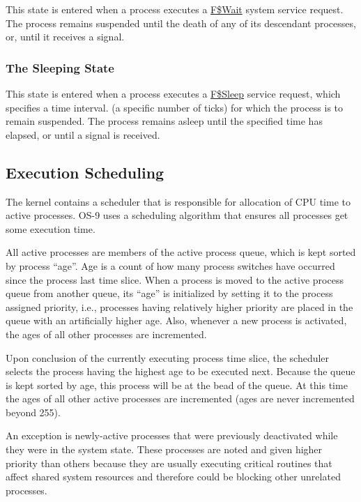\documentclass[
]{article}
\begin{document}
This state is entered when a process executes a
\hyperref[f.wait]{F\$Wait} system service request. The process remains
suspended until the death of any of its descendant processes, or, until
it receives a signal.

\subsubsection{The Sleeping State}

This state is entered when a process executes a
\hyperref[f.sleep]{F\$Sleep} service request, which specifies a time
interval. (a specific number of ticks) for which the process is to
remain suspended. The process remains asleep until the specified time
has elapsed, or until a signal is received.

\subsection{Execution Scheduling}

The kernel contains a scheduler that is responsible for allocation of
CPU time to active processes. OS-9 uses a scheduling algorithm that
ensures all processes get some execution time.

All active processes are members of the active process queue, which is
kept sorted by process ``age''. Age is a count of how many process
switches have occurred since the process\textquotesingle{} last time
slice. When a process is moved to the active process queue from another
queue, its ``age'' is initialized by setting it to the
process\textquotesingle{} assigned priority, i.e., processes having
relatively higher priority are placed in the queue with an artificially
higher age. Also, whenever a new process is activated, the ages of all
other processes are incremented.

Upon conclusion of the currently executing process\textquotesingle{}
time slice, the scheduler selects the process having the highest age to
be executed next. Because the queue is kept sorted by age, this process
will be at the bead of the queue. At this time the ages of all other
active processes are incremented (ages are never incremented beyond
255).

An exception is newly-active processes that were previously deactivated
while they were in the system state. These processes are noted and given
higher priority than others because they are usually executing critical
routines that affect shared system resources and therefore could be
blocking other unrelated processes.
\end{document}

